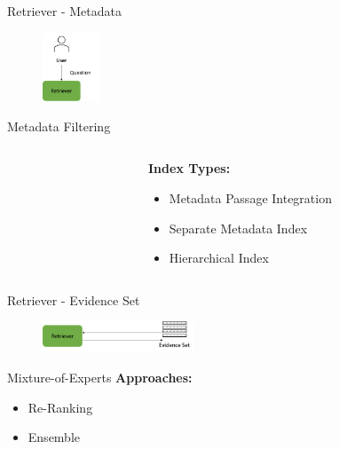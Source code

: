 \documentclass{beamer}
\begin{document}
\begin{frame}{Retriever - Metadata}
  \begin{figure}
    \includegraphics[width=0.15\textwidth]{Grafiken/User_Retriever.png}
  \end{figure}

  \begin{block}{Metadata Filtering}


\begin{columns}
  \begin{column}{.4\textwidth}
    \vfill
    \small
    \vfill
    \normalsize
  \end{column}
  \begin{column}{.5\textwidth}
    \textbf{Index Types:}
    \begin{itemize}
      \item Metadata Passage Integration
      \item Separate Metadata Index
      \item Hierarchical Index
    \end{itemize}
  \end{column}
\end{columns}


  \end{block}
\end{frame}

\begin{frame}{Retriever - Evidence Set}
  \begin{figure}
    \includegraphics[width=0.4\textwidth]{Grafiken/Retriever_Passages.png}
  \end{figure}

  \begin{block}
    {Mixture-of-Experts}
    \textbf{Approaches:}
    \begin{itemize}
      \item Re-Ranking
      \item Ensemble
    \end{itemize} 
  \end{block}
\end{frame}
\end{document}
